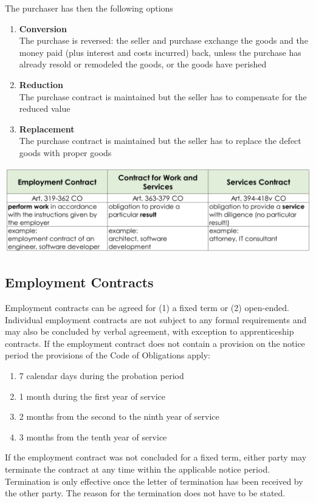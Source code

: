 \documentclass[11pt]{article}
\theoremstyle{definition}
\begin{document}
The purchaser has then the following options
\begin{enumerate}
	\item \textbf{Conversion}\\
	The purchase is reversed: the seller and purchase exchange the goods and the money paid (plus interest and costs incurred) back, unless the purchase has already resold or remodeled the goods, or the goods have perished
	\item \textbf{Reduction}\\
	The purchase contract is maintained but the seller has to compensate for the reduced value
	\item \textbf{Replacement}\\
	The purchase contract is maintained but the seller has to replace the defect goods with proper goods
\end{enumerate}
\begin{center}
	\includegraphics[width=0.9\linewidth]{img/type_contracts_work}
\end{center}

\subsection{Employment Contracts}
Employment contracts can be agreed for (1) a fixed term or (2) open-ended. Individual employment contracts are not subject to any formal requirements and may also be concluded by verbal agreement, with exception to apprenticeship contracts. If the employment contract does not contain a provision on the notice period the provisions of the Code of Obligations apply:
\begin{enumerate}
	\item 7 calendar days during the probation period
	\item 1 month during the first year of service
	\item 2 months from the second to the ninth year of service
	\item 3 months from the tenth year of service
\end{enumerate}
If the employment contract was not concluded for a fixed term, either party may terminate the contract at any time within the applicable notice period. Termination is only effective once the letter of termination has been received by the other party. The reason for the termination does not have to be stated.
\end{document}
